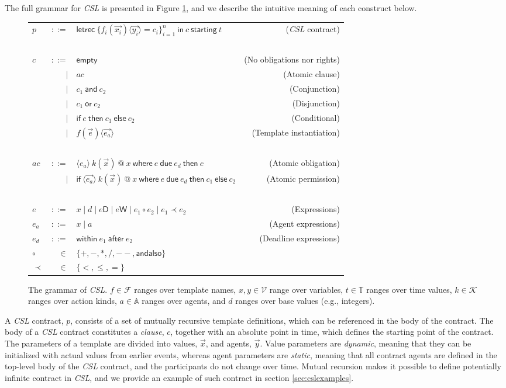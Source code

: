 \documentclass[orivec,final]{llncs-href}
\makeatletter
\newcommand{\actionkindset}{\mathcal{K}}
\newcommand{\timeset}{\mathbb{T}}
\newcommand{\agentset}{\mathbb{A}}
\newcommand{\templatenameset}{\mathcal{F}}
\newcommand{\csl}{\textit{CSL}}
\newcommand{\varset}{\mathcal{V}}
\newcommand{\ccontract}[3]{\mathsf{letrec}\ #1\ \mathsf{in}\ #2\
  \mathsf{starting}\ #3}
\newcommand{\cempty}{\mathsf{empty}}
\newcommand{\catomic}[6]{\langle#1\rangle\ #2\ \textsf{@}\ #3\
  \mathsf{where}\ #4\ \mathsf{due}\ #5\ \mathsf{then}\ #6}
\newcommand{\catomicp}[7]{\mathsf{if}\ \langle#1\rangle\ #2\ \textsf{@}\ #3\
  \mathsf{where}\ #4\ \mathsf{due}\ #5\ \mathsf{then}\ #6\
  \mathsf{else}\ #7}
\newcommand{\cand}[2]{#1\ \mathsf{and}\ #2}
\newcommand{\cor}[2]{#1\ \mathsf{or}\ #2}
\newcommand{\cifthenelse}[3]{\mathsf{if}\ #1\ \mathsf{then}\ #2\
  \mathsf{else}\ #3}
\newcommand{\cinstantiate}[3]{#1(#2)\langle#3\rangle}
\newcommand{\cwithinafter}[2]{\mathsf{within}\ #1\ \mathsf{after}\ #2}
\newcommand{\candalso}{\mathsf{andalso}}
\newcommand{\canddefault}{\cand{c_1}{c_2}}
\newcommand{\cordefault}{\cor{c_1}{c_2}}
\newcommand{\cifthenelsedefault}{\cifthenelse{e}{c_1}{c_2}}
\newcommand{\cinstantiatedefault}{\cinstantiate{f}{\vec{e}}{\vec{e_a}}}
\newenvironment{bnf}{\begin{tabular}{>{$}l<{$}>{$}r<{$}>{$}l<{$}r}}{\end{tabular}}
\newcommand{\bnfsep}{\mathbin{|}}
\makeatother
\begin{document}
The full grammar for \csl{} is presented in Figure \ref{fig:cslsyntax},
and we describe the intuitive meaning of each construct below.
\begin{figure}[b!]
  \begin{center}
    \begin{bnf}
      p &::= & \ccontract{\{\cinstantiate{f_i}{\vec{x_i}}{\vec{y_i}} =
        c_i\}_{i = 1}^n}{c}{t} & (\csl{} contract)\\
      \\
      c &::= & \cempty & (No obligations nor rights)\\
      & \bnfsep & \mathit{ac} & (Atomic clause)\\
      & \bnfsep & \canddefault & (Conjunction)\\
      & \bnfsep & \cordefault & (Disjunction)\\
      & \bnfsep & \cifthenelsedefault & (Conditional)\\
      & \bnfsep & \cinstantiatedefault & (Template instantiation)\\
      \\
      \mathit{ac} &::=& \catomic{e_a}{k(\vec{x})}{x}{e}{e_d}{c} & (Atomic
      obligation)\\
      &\bnfsep&
      \catomicp{\vec{e_a}}{k(\vec{x})}{x}{e}{e_d}{c_1}{c_2} & (Atomic
      permission)\\
      \\
      e &::=& x \bnfsep d \bnfsep e \textsf{D} \bnfsep e \textsf{W}
      \bnfsep e_1 \circ e_2 \bnfsep e_1 \prec e_2 & (Expressions)\\
      e_a &::=& x \bnfsep a & (Agent expressions)\\
      e_d &::=& \cwithinafter{e_1}{e_2}
      & (Deadline expressions)\\
      \circ &\in & \{+, -, *, /,\mathbin{--},\candalso \}\\
      \prec &\in & \{<, \leq, =\}
    \end{bnf}
  \end{center}
  \caption{The grammar of \csl{}. $f \in \templatenameset$ ranges over
    template names, $x,y \in \varset$ range over variables, $t \in
    \timeset$ ranges over time values, $k \in \actionkindset$ ranges
    over action kinds, $a \in \agentset$ ranges over agents, and $d$
    ranges over base values (e.g., integers).}
  \label{fig:cslsyntax}
\end{figure}
A \csl{} contract, $p$, consists of a set of mutually recursive
template definitions, which can be referenced in the body of the
contract. The body of a \csl{} contract constitutes a \emph{clause},
$c$, together with an absolute point in time, which defines the
starting point of the contract. The parameters of a template are
divided into values, $\vec{x}$, and agents, $\vec{y}$. Value
parameters are \emph{dynamic}, meaning that they can be initialized
with actual values from earlier events, whereas agent parameters
are \emph{static}, meaning that all contract agents are defined in the 
top-level body of the \csl{} contract, and the participants do not
change over time. Mutual recursion makes it possible to define
potentially infinite contract in \csl{}, and we provide an example of
such contract in section \ref{sec:cslexamples}.
\end{document}
